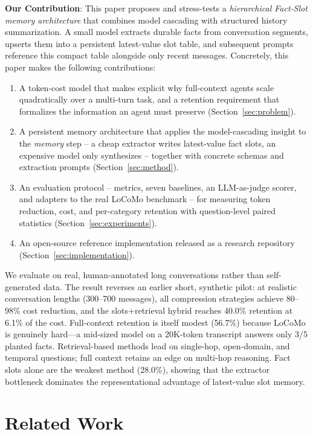 \documentclass[conference]{IEEEtran}
\begin{document}
\textbf{Our Contribution}: This paper proposes and stress-tests a \textit{hierarchical Fact-Slot memory architecture} that combines model cascading with structured history summarization. A small model extracts durable facts from conversation segments, upserts them into a persistent latest-value slot table, and subsequent prompts reference this compact table alongside only recent messages. Concretely, this paper makes the following contributions:
\begin{enumerate}
    \item A token-cost model that makes explicit why full-context agents scale quadratically over a multi-turn task, and a retention requirement that formalizes the information an agent must preserve (Section~\ref{sec:problem}).
    \item A persistent memory architecture that applies the model-cascading insight to the \emph{memory} step -- a cheap extractor writes latest-value fact slots, an expensive model only synthesizes -- together with concrete schemas and extraction prompts (Section~\ref{sec:method}).
    \item An evaluation protocol -- metrics, seven baselines, an LLM-as-judge scorer, and adapters to the real LoCoMo benchmark -- for measuring token reduction, cost, and per-category retention with question-level paired statistics (Section~\ref{sec:experiments}).
    \item An open-source reference implementation released as a research repository (Section~\ref{sec:implementation}).
\end{enumerate}
We evaluate on real, human-annotated long conversations rather than self-generated data. The result reverses an earlier short, synthetic pilot: at realistic conversation lengths (300--700 messages), all compression strategies achieve 80--98\% cost reduction, and the slots+retrieval hybrid reaches 40.0\% retention at 6.1\% of the cost. Full-context retention is itself modest (56.7\%) because LoCoMo is genuinely hard---a mid-sized model on a 20K-token transcript answers only 3/5 planted facts. Retrieval-based methods lead on single-hop, open-domain, and temporal questions; full context retains an edge on multi-hop reasoning. Fact slots alone are the weakest method (28.0\%), showing that the extractor bottleneck dominates the representational advantage of latest-value slot memory.

\section{Related Work}
\end{document}
